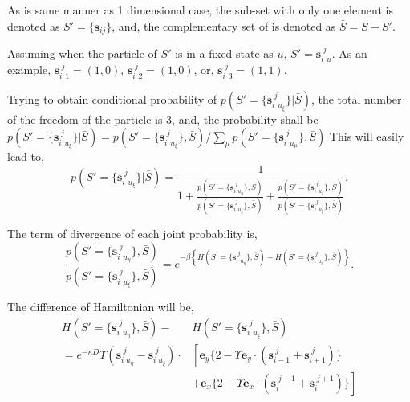 \documentclass{article}
\begin{document}
As is same manner as 1 dimensional case, the sub-set with only one element is denoted as $S' = \{\bm{s}_{ij}\}$, and, 
the complementary set of is denoted as $\bar{S} = S - S'$.

Assuming when the particle of $S'$ is in a fixed state as $u$, $S' = \bm{s}_{i\mspace{7mu}u}^{\mspace{5mu}j}$. 
As an example, $\bm{s}_{i\mspace{7mu}1}^{\mspace{5mu}j} = (1, 0)$,
 $\bm{s}_{i\mspace{7mu}2}^{\mspace{5mu}j} = (1, 0)$, or, $\bm{s}_{i\mspace{7mu}3}^{\mspace{5mu}j} = (1, 1)$.

Trying to obtain conditional probability of $p(S'=\{\bm{s}_{i\mspace{7mu}u_{\xi}}^{\mspace{5mu}j}\}|\bar{S})$, the total number of the freedom of the particle is 3,
and, the probability shall be 
$p(S'=\{\bm{s}_{i\mspace{7mu}u_{\xi}}^{\mspace{5mu}j}\}|\bar{S}) = p(S'=\{\bm{s}_{i\mspace{7mu}u_{\xi}}^{\mspace{5mu}j}\}, \bar{S})/\sum_{\mu} p(S'=\{\bm{s}_{i\mspace{7mu}u_{\mu}}^{\mspace{5mu}j}\}, \bar{S})$
This will easily lead to,
\begin{equation}
 p(S'=\{\bm{s}_{i\mspace{7mu}u_{\xi}}^{\mspace{5mu}j}\}|\bar{S}) = 
  \frac{1}{1
  + \frac{p(S'=\{\bm{s}_{i\mspace{7mu}u_{\eta}}^{\mspace{5mu}j}\}, \bar{S})}{p(S'=\{\bm{s}_{i\mspace{7mu}u_{\xi}}^{\mspace{5mu}j}\}, \bar{S})}
  + \frac{p(S'=\{\bm{s}_{i\mspace{7mu}u_{\zeta}}^{\mspace{5mu}j}\}, \bar{S})}{p(S'=\{\bm{s}_{i\mspace{7mu}u_{\xi}}^{\mspace{5mu}j}\}, \bar{S})}}.
\end{equation}

The term of divergence of each joint probability is,
\begin{equation}
 \frac{p(S'=\{\bm{s}_{i\mspace{7mu}u_{\eta}}^{\mspace{5mu}j}\}, \bar{S})}{p(S'=\{\bm{s}_{i\mspace{7mu}u_{\xi}}^{\mspace{5mu}j}\}, \bar{S})}
  = e^{-\beta\left\{H\left(S'=\{\bm{s}_{i\mspace{7mu}u_{\eta}}^{\mspace{5mu}j}\}, \bar{S}\right)
	     - H\left(S'=\{\bm{s}_{i\mspace{7mu}u_{\eta}}^{\mspace{5mu}j}\}, \bar{S}\right)\right\}}.
\end{equation}

The difference of Hamiltonian will be,
\begin{equation}
 \begin{aligned}
    H(S'=\{\bm{s}_{i\mspace{7mu}u_{\eta}}^{\mspace{5mu}j}\}, \bar{S})
  - &H(S'=\{\bm{s}_{i\mspace{7mu}u_{\xi}}^{\mspace{5mu}j}\}, \bar{S}) \\
   = e^{-\kappa\bar{D}}\Upsilon(\bm{s}_{i\mspace{5mu}u_{\eta}}^{\mspace{5mu}j} - \bm{s}_{i\mspace{5mu}u_{\xi}}^{\mspace{5mu}j})\cdot
  &\left[\bm{e}_y\{2 - \Upsilon\bm{e}_y\cdot(\bm{s}_{i-1}^{\mspace{5mu}j} + \bm{s}_{i+1}^{\mspace{5mu}j})\}\right.\\
  &\left.+ \bm{e}_x\{2 - \Upsilon\bm{e}_x\cdot(\bm{s}_{i}^{\mspace{5mu}j-1} + \bm{s}_{i}^{\mspace{5mu}j+1})\}\right]
 \end{aligned}
\end{equation}
\end{document}
